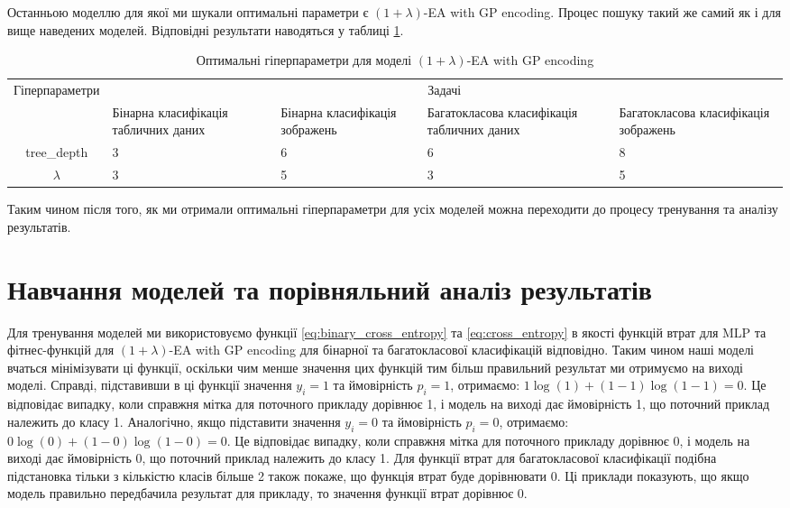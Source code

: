 Останньою моделлю для якої ми шукали оптимальні параметри є $(1+\lambda)$-EA with GP encoding. Процес пошуку такий же самий як і для вище наведених моделей. Відповідні результати наводяться у таблиці \ref{tab_hyperparameters_for_evol_alg}.

\begin{table}[ht]
	\centering
	\begin{adjustbox}{max width=\textwidth}
		\begin{tabular}{|c|p{3cm}|p{3cm}|p{3cm}|p{3cm}|}
			\hline \multirow{2}{*}{Гіперпараметри} & \multicolumn{4}{c|}{Задачі} \\
			\cline{2-5} & Бінарна класифікація табличних даних & Бінарна класифікація зображень & Багатокласова класифікація табличних даних & Багатокласова класифікація зображень \\
			\hline tree\_depth & 3 & 6 & 6 & 8 \\
			\hline $\lambda$ & 3 & 5 & 3 & 5 \\
			\hline
		\end{tabular}
	\end{adjustbox}
	\caption{Оптимальні гіперпараметри для моделі $(1+\lambda)$-EA with GP encoding}
	\label{tab_hyperparameters_for_evol_alg}
\end{table}

Таким чином після того, як ми отримали оптимальні гіперпараметри для усіх моделей можна переходити до процесу тренування та аналізу результатів.

\section{Навчання моделей та порівняльний аналіз результатів}

Для тренування моделей ми використовуємо функції \ref{eq:binary_cross_entropy} та \ref{eq:cross_entropy} в якості функцій втрат для MLP та фітнес-функцій для $(1+\lambda)$-EA with GP encoding для бінарної та багатокласової класифікацій відповідно. Таким чином наші моделі вчаться мінімізувати ці функції, оскільки чим менше значення цих функцій тим більш правильний результат ми отримуємо на виході моделі. Справді, підставивши в ці функції значення $y_i=1$ та ймовірність $p_i=1$, отримаємо: $1 \log(1) + (1 - 1) \log(1 - 1) = 0$. Це відповідає випадку, коли справжня мітка для поточного прикладу дорівнює 1, і модель на виході дає ймовірність 1, що поточний приклад належить до класу 1. Аналогічно, якщо підставити значення $y_i=0$ та ймовірність $p_i=0$, отримаємо: $0 \log(0) + (1 - 0) \log(1 - 0) = 0$. Це відповідає випадку, коли справжня мітка для поточного прикладу дорівнює 0, і модель на виході дає ймовірність 0, що поточний приклад належить до класу 1. Для функції втрат для багатокласової класифікації подібна підстановка тільки з кількістю класів більше 2 також покаже, що функція втрат буде дорівнювати 0. Ці приклади показують, що якщо модель правильно передбачила результат для прикладу, то значення функції втрат дорівнює 0.

